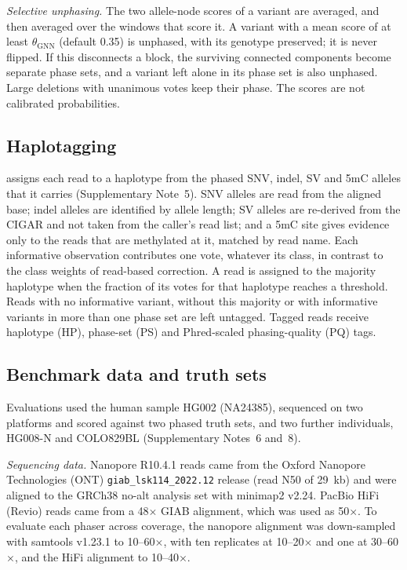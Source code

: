 \emph{Selective unphasing.}  The two allele-node scores of a variant are averaged, and then averaged over the windows that score it.  A variant with a mean score of at least $\theta_{\mathrm{GNN}}$ (default 0.35) is unphased, with its genotype preserved; it is never flipped.  If this disconnects a block, the surviving connected components become separate phase sets, and a variant left alone in its phase set is also unphased.  Large deletions with unanimous votes keep their phase.  The scores are not calibrated probabilities.

\subsection*{Haplotagging}
\toolname assigns each read to a haplotype from the phased SNV, indel, SV and 5mC alleles that it carries (Supplementary Note~5).  SNV alleles are read from the aligned base; indel alleles are identified by allele length; SV alleles are re-derived from the CIGAR and not taken from the caller's read list; and a 5mC site gives evidence only to the reads that are methylated at it, matched by read name.  Each informative observation contributes one vote, whatever its class, in contrast to the class weights of read-based correction.  A read is assigned to the majority haplotype when the fraction of its votes for that haplotype reaches a threshold.  Reads with no informative variant, without this majority or with informative variants in more than one phase set are left untagged.  Tagged reads receive haplotype (HP), phase-set (PS) and Phred-scaled phasing-quality (PQ) tags.

\subsection*{Benchmark data and truth sets}
Evaluations used the human sample HG002 (NA24385), sequenced on two platforms and scored against two phased truth sets, and two further individuals, HG008-N and COLO829BL (Supplementary Notes~6 and~8).

\emph{Sequencing data.}  Nanopore R10.4.1 reads came from the Oxford Nanopore Technologies (ONT) \texttt{giab\_lsk114\_2022.12} release (read N50 of 29~kb) and were aligned to the GRCh38 no-alt analysis set with minimap2 v2.24\cite{li2018minimap2}.  PacBio HiFi (Revio) reads came from a 48$\times$ GIAB alignment, which was used as 50$\times$.  To evaluate each phaser across coverage, the nanopore alignment was down-sampled with samtools v1.23.1\cite{danecek2021samtools} to 10--60$\times$, with ten replicates at 10--20$\times$ and one at 30--60$\times$, and the HiFi alignment to 10--40$\times$.

